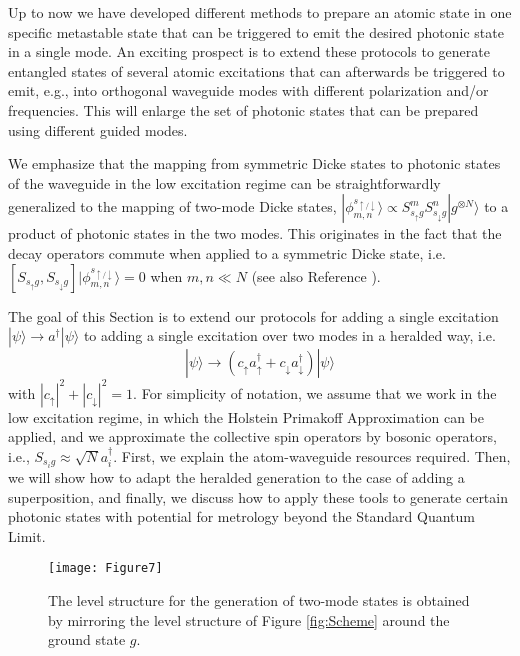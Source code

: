 \documentclass[twocolumn,pra,aps,superscriptaddress,showpacs]{revtex4-1}
\newcommand{\ket}[1]{|#1\rangle}
\begin{document}
Up to now we have developed different methods to prepare an atomic state in one specific metastable state that can be triggered to emit the desired photonic state in a single mode. An exciting prospect is to extend these protocols to generate entangled states of several atomic excitations that can afterwards be triggered to emit, e.g., into orthogonal waveguide modes with different polarization and/or frequencies. This will enlarge the set of photonic states that can be prepared using different guided modes.

We emphasize that the mapping from symmetric Dicke states to photonic states of the waveguide in the low excitation regime can be straightforwardly generalized to the mapping of two-mode Dicke states, $\ket{\phi_{m,n}^{s_{\uparrow / \downarrow}}} \propto S_{s_\uparrow g}^m S_{s_\downarrow g}^n \ket{g^{\otimes N}}$ to a product of photonic states in the two modes. This originates in the fact that the decay operators commute when applied to a symmetric Dicke state, i.e. $ \left[ S_{s_\uparrow g}, S_{s_\downarrow g}\right] \ket{\phi_{m,n}^{s_{\uparrow / \downarrow}}} =0$ when $m,n \ll N$ (see also Reference \cite{porras08a}).

The goal of this Section is to extend our protocols for adding a single excitation $\ket{\psi} \rightarrow a^\dagger \ket{\psi}$ to adding a single excitation over two modes in a heralded way, i.e. 
\begin{equation}
	\label{eq:goal_2modes}
	\ket{\psi} \rightarrow (c_\uparrow a_\uparrow^\dagger  + c_\downarrow a_\downarrow^\dagger ) \ket{\psi}
\end{equation}
 with $|c_\uparrow|^2+ |c_\downarrow|^2 = 1$. For simplicity of notation, we assume that we work in the low excitation regime, in which the Holstein Primakoff Approximation \cite{holstein40a} can be applied, and we approximate the collective spin operators by bosonic operators, i.e., $S_{s_i g} \approx \sqrt{N} a_i^\dagger$. First, we explain the atom-waveguide resources required. Then, we will show how to adapt the heralded generation to the case of adding a superposition, and finally, we discuss how to apply these tools to generate certain photonic states with potential for metrology beyond the Standard Quantum Limit.
 
 \begin{figure}[t]
 	\centering
 	\texttt{[image: Figure7]}
 	\caption{
 		The level structure for the generation of two-mode states is obtained by mirroring the level structure of Figure \ref{fig:Scheme} around the ground state $g$.
 	}
 	\label{fig:2Modes}
 \end{figure}
\end{document}
